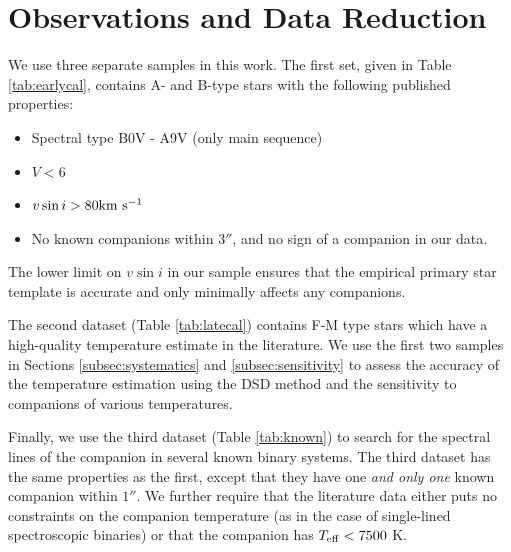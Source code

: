 \documentclass{emulateapj}
\begin{document}
\section{Observations and Data Reduction}
\label{sec:obs}
We use three separate samples in this work. The first set, given in Table \ref{tab:earlycal}, contains  A- and B-type stars with the following published properties:

\begin{itemize}
\item Spectral type B0V - A9V (only main sequence)
\item $V < 6$
\item $v\sin{i} > 80 \rm km \ s^{-1}$
\item No known companions within $3 ''$, and no sign of a companion in our data.
\end{itemize}
The lower limit on $v\sin{i}$ in our sample ensures that the empirical primary star template is accurate and only minimally affects any companions.

The second dataset (Table \ref{tab:latecal}) contains F-M type stars which have a high-quality temperature estimate in the literature. We use the first two samples in Sections \ref{subsec:systematics} and \ref{subsec:sensitivity} to assess the accuracy of the temperature estimation using the DSD method and the sensitivity to companions of various temperatures.

Finally, we use the third dataset (Table \ref{tab:known}) to search for the spectral lines of the companion in several known binary systems. The third dataset has the same properties as the first, except that they have one \emph{and only one} known companion within $1 ''$. We further require that the literature data either puts no constraints on the companion temperature (as in the case of single-lined spectroscopic binaries) or that the companion has $T_{\rm eff} < 7500$ K. 
\end{document}

